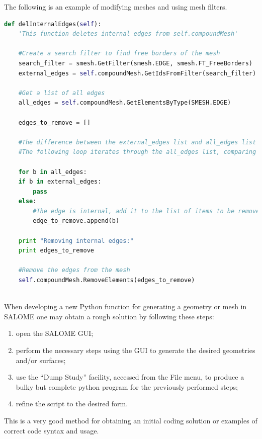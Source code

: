 The following is an example of modifying meshes and using mesh filters.

\begin{lstlisting}[language=Python]
def delInternalEdges(self):
    'This function deletes internal edges from self.compoundMesh'
    
    #Create a search filter to find free borders of the mesh
    search_filter = smesh.GetFilter(smesh.EDGE, smesh.FT_FreeBorders)
    external_edges = self.compoundMesh.GetIdsFromFilter(search_filter)
    
    #Get a list of all edges
    all_edges = self.compoundMesh.GetElementsByType(SMESH.EDGE)
    
    edges_to_remove = []
    
    #The difference between the external_edges list and all_edges list will be the internal edges.
    #The following loop iterates through the all_edges list, comparing it wil the external_edges list.
    
    for b in all_edges:
	if b in external_edges:
	    pass
	else:
	    #The edge is internal, add it to the list of items to be removed from the mesh
	    edge_to_remove.append(b)
    
    print "Removing internal edges:"
    print edges_to_remove
    
    #Remove the edges from the mesh
    self.compoundMesh.RemoveElements(edges_to_remove)
    
\end{lstlisting}        

When developing a new Python function for generating a geometry or mesh in SALOME one may obtain a rough solution by following these steps:

\begin{enumerate}
 \item open the SALOME GUI;
 \item perform the necessary steps using the GUI to generate the desired geometries and/or surfaces;
 \item use the ``Dump Study'' facility, accessed from the File menu, to produce a bulky but complete python program for the previously performed steps;
 \item refine the script to the desired form.
\end{enumerate}

This is a very good method for obtaining an initial coding solution or examples of correct code syntax and usage.

